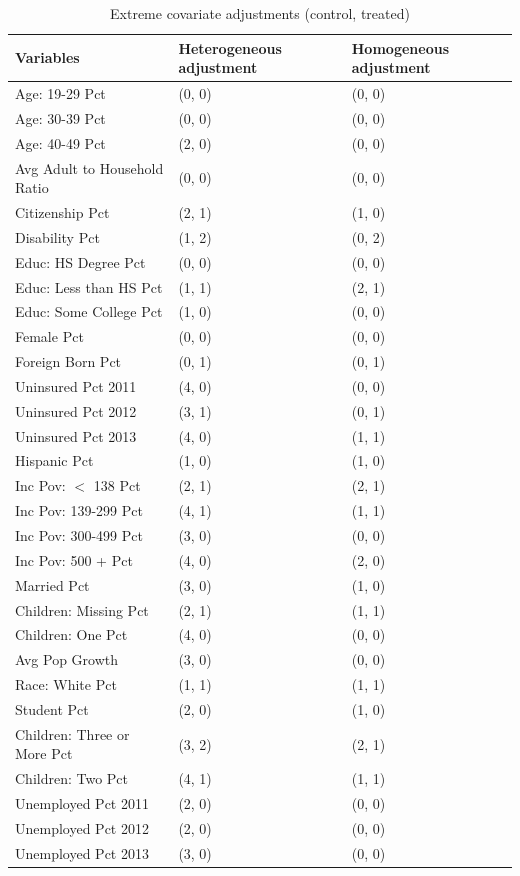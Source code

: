 \begin{table}[ht]
\centering
    \caption{Extreme covariate adjustments (control, treated)}
    \label{tab:extreme1}
\begin{tabular}{lll}
  \hline
Variables & Heterogeneous adjustment & Homogeneous adjustment \\ 
  \hline
Age: 19-29 Pct & (0, 0) & (0, 0) \\ 
  Age: 30-39 Pct & (0, 0) & (0, 0) \\ 
  Age: 40-49 Pct & (2, 0) & (0, 0) \\ 
  Avg Adult to Household Ratio & (0, 0) & (0, 0) \\ 
  Citizenship Pct & (2, 1) & (1, 0) \\ 
  Disability Pct & (1, 2) & (0, 2) \\ 
  Educ: HS Degree Pct & (0, 0) & (0, 0) \\ 
  Educ: Less than HS Pct & (1, 1) & (2, 1) \\ 
  Educ: Some College Pct & (1, 0) & (0, 0) \\ 
  Female Pct & (0, 0) & (0, 0) \\ 
  Foreign Born Pct & (0, 1) & (0, 1) \\ 
  Uninsured Pct 2011 & (4, 0) & (0, 0) \\ 
  Uninsured Pct 2012 & (3, 1) & (0, 1) \\ 
  Uninsured Pct 2013 & (4, 0) & (1, 1) \\ 
  Hispanic Pct & (1, 0) & (1, 0) \\ 
  Inc Pov: $<$ 138 Pct & (2, 1) & (2, 1) \\ 
  Inc Pov: 139-299 Pct & (4, 1) & (1, 1) \\ 
  Inc Pov: 300-499 Pct & (3, 0) & (0, 0) \\ 
  Inc Pov: 500 + Pct & (4, 0) & (2, 0) \\ 
  Married Pct & (3, 0) & (1, 0) \\ 
  Children: Missing Pct & (2, 1) & (1, 1) \\ 
  Children: One Pct & (4, 0) & (0, 0) \\ 
  Avg Pop Growth & (3, 0) & (0, 0) \\ 
  Race: White Pct & (1, 1) & (1, 1) \\ 
  Student Pct & (2, 0) & (1, 0) \\ 
  Children: Three or More Pct & (3, 2) & (2, 1) \\ 
  Children: Two Pct & (4, 1) & (1, 1) \\ 
  Unemployed Pct 2011 & (2, 0) & (0, 0) \\ 
  Unemployed Pct 2012 & (2, 0) & (0, 0) \\ 
  Unemployed Pct 2013 & (3, 0) & (0, 0) \\ 
   \hline
\end{tabular}
\end{table}

